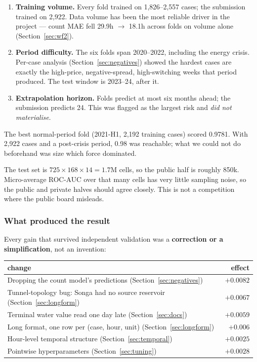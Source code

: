 \begin{enumerate}
  \item \textbf{Training volume.} Every fold trained on 1{,}826--2{,}557 cases; the submission
        trained on 2{,}922. Data volume has been the most reliable driver in the project --- count
        MAE fell 29.9h $\to$ 18.1h across folds on volume alone (Section~\ref{sec:wf2}).
  \item \textbf{Period difficulty.} The six folds span 2020--2022, including the energy crisis.
        Per-case analysis (Section~\ref{sec:negatives}) showed the hardest cases are exactly the
        high-price, negative-spread, high-switching weeks that period produced. The test window
        is 2023--24, after it.
  \item \textbf{Extrapolation horizon.} Folds predict at most six months ahead; the submission
        predicts 24. This was flagged as the largest risk and \emph{did not materialise}.
\end{enumerate}

The best normal-period fold (2021-H1, 2{,}192 training cases) scored 0.9781. With 2{,}922 cases
and a post-crisis period, 0.98 was reachable; what we could not do beforehand was size which
force dominated.

\begin{finding}
The test set is $725 \times 168 \times 14 = 1.7$M cells, so the public half is roughly 850k.
Micro-average ROC-AUC over that many cells has very little sampling noise, so the public and
private halves should agree closely. This is not a competition where the public board misleads.
\end{finding}

\subsubsection*{What produced the result}

Every gain that survived independent validation was a \textbf{correction or a simplification},
not an invention:

\begin{center}\small
\begin{tabular}{lr}
\toprule
change & effect \\
\midrule
Dropping the count model's predictions (Section~\ref{sec:negatives}) & $+0.0082$ \\
Tunnel-topology bug: Songa had no source reservoir (Section~\ref{sec:longform}) & $+0.0067$ \\
Terminal water value read one day late (Section~\ref{sec:docs}) & $+0.0059$ \\
Long format, one row per (case, hour, unit) (Section~\ref{sec:longform}) & $+0.006$ \\
Hour-level temporal structure (Section~\ref{sec:temporal}) & $+0.0025$ \\
Pointwise hyperparameters (Section~\ref{sec:tuning}) & $+0.0028$ \\
\bottomrule
\end{tabular}
\end{center}

